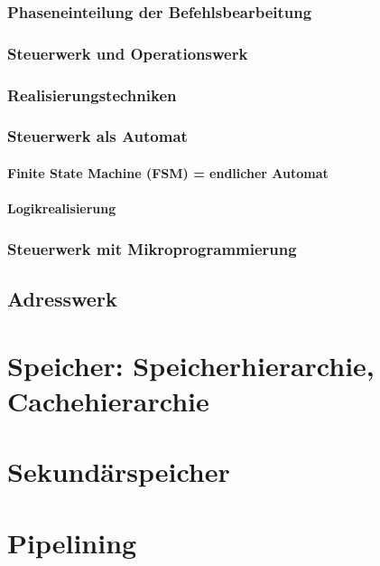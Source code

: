 \subsection*{Phaseneinteilung der Befehlsbearbeitung}
\subsection*{Steuerwerk und Operationswerk}
\subsection*{Realisierungstechniken}

\subsection{Steuerwerk als Automat}
\subsubsection*{Finite State Machine (FSM) = endlicher Automat}
\subsubsection*{Logikrealisierung}

\subsection{Steuerwerk mit Mikroprogrammierung}

\section{Adresswerk}

\chapter{Speicher: Speicherhierarchie, Cachehierarchie}

\chapter{Sekundärspeicher}

\chapter{Pipelining}

